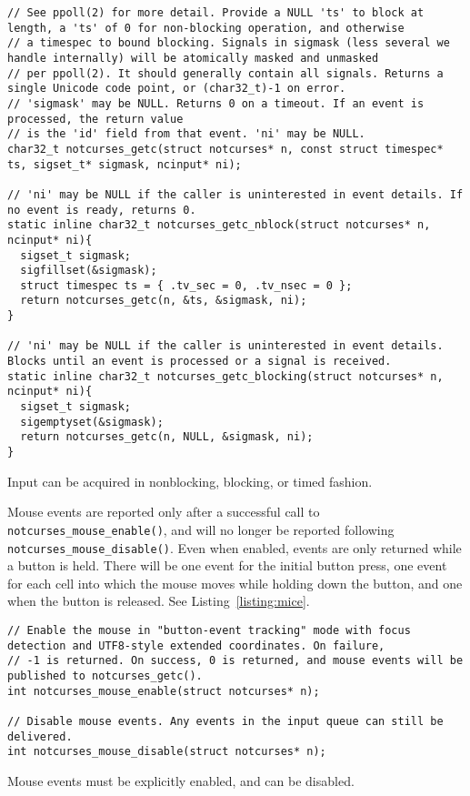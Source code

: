 \begin{listing}[!htb]
\begin{verbatim}
// See ppoll(2) for more detail. Provide a NULL 'ts' to block at length, a 'ts' of 0 for non-blocking operation, and otherwise
// a timespec to bound blocking. Signals in sigmask (less several we handle internally) will be atomically masked and unmasked
// per ppoll(2). It should generally contain all signals. Returns a single Unicode code point, or (char32_t)-1 on error.
// 'sigmask' may be NULL. Returns 0 on a timeout. If an event is processed, the return value
// is the 'id' field from that event. 'ni' may be NULL.
char32_t notcurses_getc(struct notcurses* n, const struct timespec* ts, sigset_t* sigmask, ncinput* ni);

// 'ni' may be NULL if the caller is uninterested in event details. If no event is ready, returns 0.
static inline char32_t notcurses_getc_nblock(struct notcurses* n, ncinput* ni){
  sigset_t sigmask;
  sigfillset(&sigmask);
  struct timespec ts = { .tv_sec = 0, .tv_nsec = 0 };
  return notcurses_getc(n, &ts, &sigmask, ni);
}

// 'ni' may be NULL if the caller is uninterested in event details. Blocks until an event is processed or a signal is received.
static inline char32_t notcurses_getc_blocking(struct notcurses* n, ncinput* ni){
  sigset_t sigmask;
  sigemptyset(&sigmask);
  return notcurses_getc(n, NULL, &sigmask, ni);
}
\end{verbatim}
\caption{Input can be acquired in nonblocking, blocking, or timed fashion.}
\label{listing:input}
\end{listing}

Mouse events are reported only after a successful call to
\texttt{notcurses\_mouse\_enable()}, and will no longer be reported following
\texttt{notcurses\_mouse\_disable()}. Even when enabled, events are only
returned while a button is held. There will be one event for the initial button
press, one event for each cell into which the mouse moves while holding down
the button, and one when the button is released. See Listing~\ref{listing:mice}.

\begin{listing}[!htb]
\begin{verbatim}
// Enable the mouse in "button-event tracking" mode with focus detection and UTF8-style extended coordinates. On failure,
// -1 is returned. On success, 0 is returned, and mouse events will be published to notcurses_getc().
int notcurses_mouse_enable(struct notcurses* n);

// Disable mouse events. Any events in the input queue can still be delivered.
int notcurses_mouse_disable(struct notcurses* n);
\end{verbatim}
\caption{Mouse events must be explicitly enabled, and can be disabled.}
\label{listing:mice}
\end{listing}

